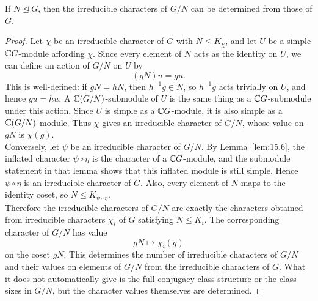 \documentclass[../Odyssey_Project.tex]{subfiles}
\begin{document}
\begin{lemma}
\label{lem:15.13}
If $N \trianglelefteq G$, then the irreducible characters of $G/N$ can be determined from those of $G$.
\end{lemma}
\begin{proof}
    Let $\chi$ be an irreducible character of $G$ with $N\leq K_\chi$, and let $U$ be a simple $\mathbb{C} G$-module affording $\chi$. Since every element of $N$ acts as the identity on $U$, we can define an action of $G/N$ on $U$ by
    \[
        (gN)u=gu.
    \]
    This is well-defined: if $gN=hN$, then $h^{-1}g\in N$, so $h^{-1}g$ acts trivially on $U$, and hence $gu=hu$. A $\mathbb{C}(G/N)$-submodule of $U$ is the same thing as a $\mathbb{C} G$-submodule under this action. Since $U$ is simple as a $\mathbb{C} G$-module, it is also simple as a $\mathbb{C}(G/N)$-module. Thus $\chi$ gives an irreducible character of $G/N$, whose value on $gN$ is $\chi(g)$.\\
    Conversely, let $\psi$ be an irreducible character of $G/N$. By Lemma~\ref{lem:15.6}, the inflated character $\psi\circ\eta$ is the character of a $\mathbb{C} G$-module, and the submodule statement in that lemma shows that this inflated module is still simple. Hence $\psi\circ\eta$ is an irreducible character of $G$. Also, every element of $N$ maps to the identity coset, so $N\leq K_{\psi\circ\eta}$.\\
    Therefore the irreducible characters of $G/N$ are exactly the characters obtained from irreducible characters $\chi_i$ of $G$ satisfying $N\leq K_i$. The corresponding character of $G/N$ has value
    \[
        gN\mapsto\chi_i(g)
    \]
    on the coset $gN$. This determines the number of irreducible characters of $G/N$ and their values on elements of $G/N$ from the irreducible characters of $G$. What it does not automatically give is the full conjugacy-class structure or the class sizes in $G/N$, but the character values themselves are determined.
\end{proof}
\end{document}
